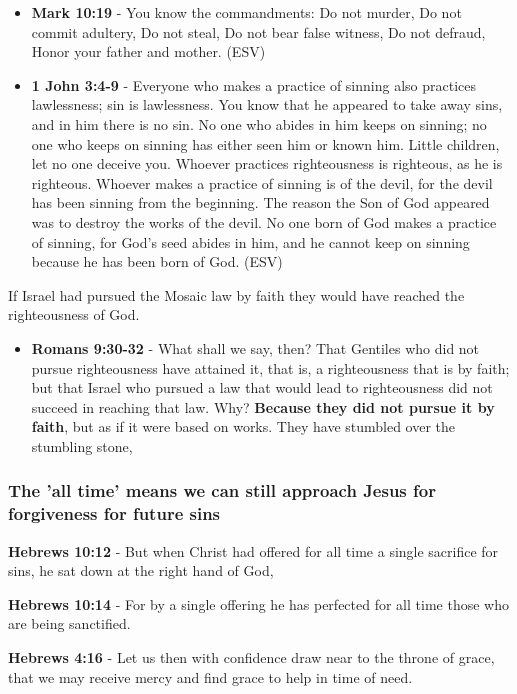 \documentclass[11pt]{article}
\begin{document}
\begin{itemize}
\item \textbf{Mark 10:19} - You know the commandments: Do not murder, Do not commit adultery, Do not steal, Do not bear false witness, Do not defraud, Honor your father and mother. (ESV)
\item \textbf{1 John 3:4-9} - Everyone who makes a practice of sinning also practices lawlessness; sin is lawlessness.  You know that he appeared to take away sins, and in him there is no sin.  No one who abides in him keeps on sinning; no one who keeps on sinning has either seen him or known him.  Little children, let no one deceive you.  Whoever practices righteousness is righteous, as he is righteous.  Whoever makes a practice of sinning is of the devil, for the devil has been sinning from the beginning.  The reason the Son of God appeared was to destroy the works of the devil.  No one born of God makes a practice of sinning, for God's seed abides in him, and he cannot keep on sinning because he has been born of God.  (ESV)
\end{itemize}

If Israel had pursued the Mosaic law by faith they would have reached the righteousness of God.

\begin{itemize}
\item \textbf{Romans 9:30-32} - What shall we say, then? That Gentiles who did not pursue righteousness have attained it, that is, a righteousness that is by faith; but that Israel who pursued a law that would lead to righteousness did not succeed in reaching that law.  Why? \textbf{Because they did not pursue it by faith}, but as if it were based on works. They have stumbled over the stumbling stone,
\end{itemize}

\subsubsection{The 'all time' means we can still approach Jesus for forgiveness for future sins}
\label{sec:orga942f20}
\textbf{Hebrews 10:12} - But when Christ had offered for all time a single sacrifice for sins, he sat down at the right hand of God,

\textbf{Hebrews 10:14} - For by a single offering he has perfected for all time those who are being sanctified.

\textbf{Hebrews 4:16} - Let us then with confidence draw near to the throne of grace, that we may receive mercy and find grace to help in time of need.
\end{document}
